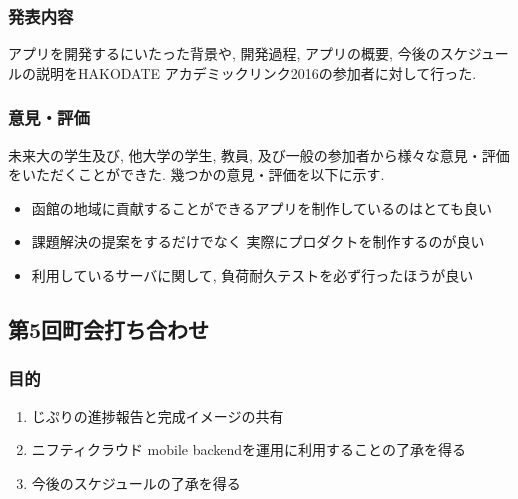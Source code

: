 \subsubsection{発表内容}
アプリを開発するにいたった背景や, 開発過程, アプリの概要, 今後のスケジュールの説明をHAKODATE アカデミックリンク2016の参加者に対して行った.
\subsubsection{意見・評価}
未来大の学生及び, 他大学の学生, 教員, 及び一般の参加者から様々な意見・評価をいただくことができた. 幾つかの意見・評価を以下に示す.
\begin{itemize}
    \item 函館の地域に貢献することができるアプリを制作しているのはとても良い
    \item 課題解決の提案をするだけでなく 実際にプロダクトを制作するのが良い
    \item 利用しているサーバに関して, 負荷耐久テストを必ず行ったほうが良い
\end{itemize}


\subsection{第5回町会打ち合わせ}
\subsubsection{目的}
\begin{enumerate}
    \item じぷりの進捗報告と完成イメージの共有
    \item ニフティクラウド mobile backendを運用に利用することの了承を得る
    \item 今後のスケジュールの了承を得る
\end{enumerate}

